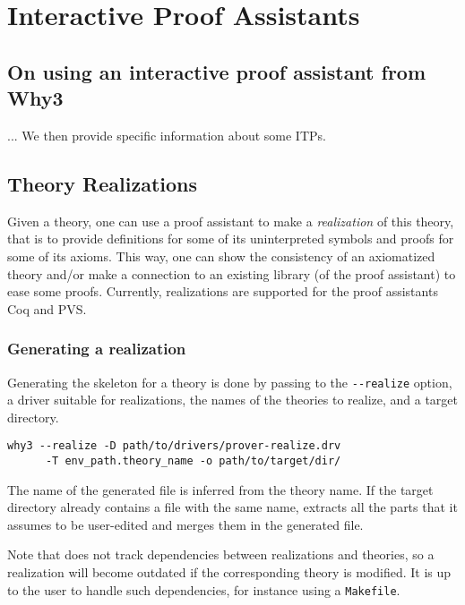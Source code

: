 
\chapter{Interactive Proof Assistants}

\section{On using an interactive proof assistant from Why3}


... We then provide specific information about some ITPs.

\section{Theory Realizations}
\label{sec:realizations}

Given a \why theory, one can use a proof assistant to make a
\emph{realization} of this theory, that is to provide definitions for
some of its uninterpreted symbols and proofs for some of its
axioms. This way, one can show the consistency of an axiomatized
theory and/or make a connection to an existing library (of the proof
assistant) to ease some proofs.
Currently, realizations are supported for the proof assistants Coq and PVS.

\subsection{Generating a realization}

Generating the skeleton for a theory is done by passing to \why the
\verb+--realize+ option, a driver suitable for realizations, the names of
the theories to realize, and a target directory.

\begin{verbatim}
why3 --realize -D path/to/drivers/prover-realize.drv
      -T env_path.theory_name -o path/to/target/dir/
\end{verbatim}

The name of the generated file is inferred from the theory name. If the
target directory already contains a file with the same name, \why
extracts all the parts that it assumes to be user-edited and merges them in
the generated file.

Note that \why does not track dependencies between realizations and
theories, so a realization will become outdated if the corresponding
theory is modified.
It is up to the user to handle such dependencies, for instance using a
\texttt{Makefile}.

